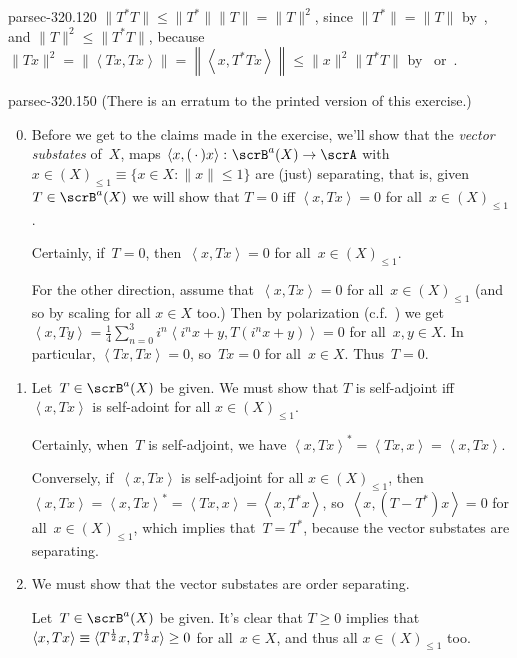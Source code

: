 \documentclass[b5page]{book}
\begin{document}
\begin{solution}{parsec-320.120}%
$\|T^*T\|\leq \|T^*\|\|T\|=\|T\|^2$,
since $\|T^*\|=\|T\|$ by~,
and 
$\|T\|^2 \leq \|T^*T \|$,
because $\|Tx\|^2
=\left\|\left<Tx,Tx\right>\right\|
= \left\|\left<x,T^*Tx\right>\right\|
\leq \|x\|^2 \|T^*T\|$
by~ or~.
\end{solution}
\begin{solution}{parsec-320.150}%
(There is an erratum to the printed version of this exercise.)
\begin{enumerate}
\setcounter{enumi}{-1}
\item
Before we get to the claims
made in the exercise,
we'll show that the \emph{vector substates} of~$X$,
maps $\left<x,(\,\cdot\,)x\right>
\colon \scrB^a(X)\to \scrA$ with~$x\in (X)_{\leq 1}
\equiv
\{x\in X\colon \|x\|\leq 1\}$
are (just) separating,
that is,
given~$T\in \scrB^a(X)$ 
we will show that $T=0$ iff $\left<x,Tx\right>=0$
for all~$x\in (X)_{\leq 1}$.

Certainly, if~$T=0$, then~$\left<x,Tx\right>=0$ for all~$x\in (X)_{\leq 1}$.

For the other direction,
assume that~$\left<x,Tx\right>=0$ for all~$x\in (X)_{\leq 1}$
(and so by scaling for all $x\in X$ too.)
Then by polarization (c.f.~)
we get
$\left<x,Ty\right>
= \frac{1}{4}\sum_{n=0}^3 i^n \left<i^nx+y,T(i^nx+y)\right>=0$
for all~$x,y\in X$.
In particular, 
$\left<Tx,Tx\right>=0$, so~$Tx=0$ for all~$x\in X$.
Thus~$T=0$.

\item
Let~$T\in\scrB^a(X)$ be given.
We must show that $T$ is self-adjoint
iff $\left<x,Tx\right>$ is self-adoint for all
$x\in (X)_{\leq 1}$.

Certainly, when~$T$ is self-adjoint,
we have $\left<x,Tx\right>^*
= \left<Tx,x\right>=\left<x,Tx\right>$.

Conversely, if~$\left<x,Tx\right>$ is self-adjoint for all
$x\in (X)_{\leq 1}$,
then $\left<x,Tx\right>
={\left<x,Tx\right>}^*
=\left<Tx,x\right>
=\left<x,T^*x\right>$,
so~$\left<x,(T-T^*)x\right>=0$
for all~$x\in (X)_{\leq 1}$,
which implies that~$T=T^*$,
because the vector substates are separating.

\item
We must show that the vector substates are order
separating.

Let~$T\in \scrB^a(X)$ be given.
It's clear that $T\geq 0$ 
implies that
$\left<x,Tx\right>\equiv \left<\smash{T^{\frac{1}{2}}x,
T^{\frac{1}{2}}x}\right> \geq 0$
for all~$x\in X$, and thus all $x\in (X)_{\leq 1}$ too.


\end{enumerate}
\end{solution}
\end{document}

